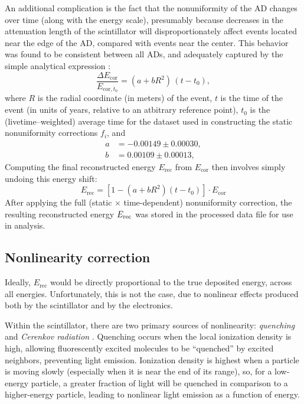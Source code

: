 \documentclass[../thesis.tex]{subfiles}
\begin{document}
An additional complication is the fact that the nonuniformity of the AD changes over time (along with the energy scale), presumably because decreases in the attenuation length of the scintillator will disproportionately affect events located near the edge of the AD, compared with events near the center. This behavior was found to be consistent between all ADs, and adequately captured by the simple analytical expression \cite[p. 16]{yuryNonUni2}:
\begin{equation}
  \frac{\Delta E_{\mathrm{cor}}}{E_{\mathrm{cor},t_0}} = (a + b R^2)\, (t - t_0),
\end{equation}
where $R$ is the radial coordinate (in meters) of the event, $t$ is the time of the event (in units of years, relative to an atbitrary reference point), $t_0$ is the (livetime--weighted) average time for the dataset used in constructing the static nonuniformity corrections $f_i$, and
\begin{align*}
  a &= -0.00149 \pm 0.00030,\\
  b &= 0.00109 \pm 0.00013,
\end{align*}
Computing the final reconstructed energy $E_{\mathrm{rec}}$ from $E_{\mathrm{cor}}$ then involves simply undoing this energy shift:
\begin{equation}
  E_{\mathrm{rec}} = \left[ 1 - (a + b R^2) (t - t_0) \right] \cdot E_{\mathrm{cor}}
\end{equation}
After applying the full (static $\times$ time-dependent) nonuniformity correction, the resulting reconstructed energy $E_\mathrm{rec}$ was stored in the processed data file for use in analysis.

\subsection{Nonlinearity correction}
\label{sec:reconEnergyNL}

Ideally, $E_{\mathrm{rec}}$ would be directly proportional to the true deposited energy, across all energies. Unfortunately, this is not the case, due to nonlinear effects produced both by the scintillator and by the electronics.

Within the scintillator, there are two primary sources of nonlinearity: \emph{quenching} \cite{Birks_1951} and \emph{Cerenkov radiation} \cite{cerenkov}. Quenching occurs when the local ionization density is high, allowing fluorescently excited molecules to be ``quenched'' by excited neighbors, preventing light emission. Ionization density is highest when a particle is moving slowly (especially when it is near the end of its range), so, for a low-energy particle, a greater fraction of light will be quenched in comparison to a higher-energy particle, leading to nonlinear light emission as a function of energy.
\end{document}
